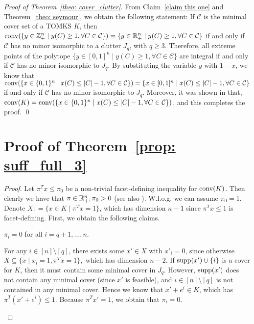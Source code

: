 \begin{appendices}
\begin{proof}[Proof of Theorem~\ref{theo: cover_clutter}]
From Claim~\ref{claim this one} and Theorem~\ref{theo: seymour}, we obtain the following statement: If $\mathcal C$ is the minimal cover set of a TOMKS $K$, then 
$
\operatorname{conv}(\{y \in \mathbb{Z}^n_+ \mid y(C) \geq 1, \forall C \in \mathcal C\}) = \{y \in \mathbb{R}^n_+ \mid y(C) \geq 1, \forall C \in \mathcal C\}
$
if and only if $\mathcal C$ has no minor isomorphic to a clutter $J_q$, with $q \geq 3$. 
Therefore, all extreme points of the polytope $\{y \in [0,1]^n \mid y(C) \geq 1, \forall C \in \mathcal C\}$ are integral if and only if $\mathcal C$ has no minor isomorphic to $J_q$. 
By substituting the variable $y$ with $1-x$, we know that $\operatorname{conv}(\{x \in \{0,1\}^n \mid x(C) \leq |C| - 1, \forall C \in \mathcal C\}) = \{x \in [0,1]^n \mid x(C) \leq |C| - 1, \forall C \in \mathcal C\}$ if and only if $\mathcal C$ has no minor isomorphic to $J_q$. 
Moreover, it was shown in \cite{balas1972canonical} that, $\operatorname{conv}(K) = \operatorname{conv}(\{x \in \{0,1\}^n \mid x(C) \leq |C| - 1, \forall C \in \mathcal C\})$,
and this completes the proof.
\qed \end{proof}



\section{Proof of Theorem~\ref{prop: suff_full_3}}
\label{subsec: proof_suff_full_3}

\begin{proof}
Let $\pi^T x \leq \pi_0$ be a non-trivial facet-defining inequality for $\operatorname{conv}(K)$. 
Then clearly we have that $\pi \in \mathbb{R}^n_+, \pi_0 > 0$ (see also \cite{hammer1975facet}). W.l.o.g. we can assume $\pi_0 = 1$. Denote $X: = \{x \in K \mid \pi^T x = 1\}$, which has dimension $n-1$ since $\pi^T x \leq 1$ is facet-defining. 
First, we obtain the following claims.
\begin{claim}
\label{claim: charact_1}
$\pi_i = 0$ for all $i = q+1, \ldots, n$.
\end{claim}
\begin{cpf}
For any $i \in [n] \setminus [q]$, there exists some $x' \in X$ with $x'_i = 0$, since otherwise $X \subseteq \{x \mid x_i = 1, \pi^T x = 1\},$ which has dimension $n-2$. 
If $\operatorname{supp}(x') \cup \{i\}$ is a cover for $K$, then it must contain some minimal cover in $J_q$. 
However, $\operatorname{supp}(x')$ does not contain any minimal cover (since $x'$ is feasible), and $i \in [n] \setminus [q]$ is not contained in any minimal cover. Hence we know that $x' + e^i \in K$, which has $\pi^T (x' + e^i) \leq 1$. 
Because $\pi^T x' = 1$, we obtain that $\pi_i = 0$. 
\end{cpf}



\end{proof}
\end{appendices}
